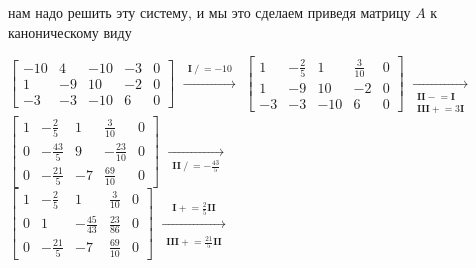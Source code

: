 \documentclass{article}
\begin{document}
  \noindent
  нам надо решить эту систему, и мы это сделаем приведя матрицу $A$ к каноническому виду

  \noindent
  $\left[\begin{matrix}-10 & 4 & -10 & -3 & 0\\1 & -9 & 10 & -2 & 0\\-3 & -3 & -10 & 6 & 0\end{matrix}\right]$
  $\xrightarrow[\begin{matrix}  \\  \end{matrix}]{\begin{matrix} \textbf{I} \mathrel{/}= -10 \end{matrix}}$
  $\left[\begin{matrix}1 & - \frac{2}{5} & 1 & \frac{3}{10} & 0\\1 & -9 & 10 & -2 & 0\\-3 & -3 & -10 & 6 & 0\end{matrix}\right]$
  $\xrightarrow[\begin{matrix} \textbf{II} \mathrel{-}= \textbf{I} \\ \textbf{III} \mathrel{+}= 3 \textbf{I} \end{matrix}]{\begin{matrix}  \end{matrix}}$
  $\left[\begin{matrix}1 & - \frac{2}{5} & 1 & \frac{3}{10} & 0\\0 & - \frac{43}{5} & 9 & - \frac{23}{10} & 0\\0 & - \frac{21}{5} & -7 & \frac{69}{10} & 0\end{matrix}\right]$
  $\xrightarrow[\begin{matrix} \textbf{II} \mathrel{/}= - \frac{43}{5} \\  \end{matrix}]{\begin{matrix}  \end{matrix}}$ \\
  $\left[\begin{matrix}1 & - \frac{2}{5} & 1 & \frac{3}{10} & 0\\0 & 1 & - \frac{45}{43} & \frac{23}{86} & 0\\0 & - \frac{21}{5} & -7 & \frac{69}{10} & 0\end{matrix}\right]$
  $\xrightarrow[\begin{matrix}  \\ \textbf{III} \mathrel{+}= \frac{21}{5} \textbf{II} \end{matrix}]{\begin{matrix} \textbf{I} \mathrel{+}= \frac{2}{5} \textbf{II} \end{matrix}}$
\end{document}
